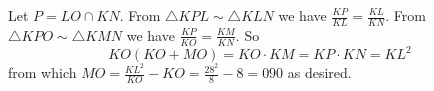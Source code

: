 Let $P=LO\cap KN$. From $\triangle{KPL}\sim\triangle{KLN}$ we have $\frac{KP}{KL}=\frac{KL}{KN}$. From $\triangle{KPO}\sim\triangle{KMN}$ we have $\frac{KP}{KO}=\frac{KM}{KN}$. So \[KO\left(KO+MO\right)=KO\cdot KM=KP\cdot KN=KL^2\] from which $MO=\frac{KL^2}{KO}-KO=\frac{28^2}{8}-8=\boxed{090}$ as desired.